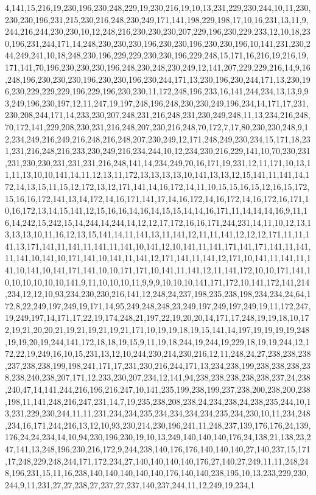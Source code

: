 4,141,15,216,19,230,196,230,248,229,19,230,216,19,10,13,231,229,230,244,10,11,230,230,230,196,231,215,230,216,248,230,249,171,141,198,229,198,17,10,16,231,13,11,9,244,216,244,230,230,10,12,248,216,230,230,230,207,229,196,230,229,233,12,10,18,230,196,231,244,171,14,248,230,230,230,196,230,230,196,230,230,196,10,141,231,230,244,249,241,10,18,248,230,196,229,229,230,230,196,229,248,15,171,16,216,19,216,19,171,141,70,196,230,230,230,196,248,230,248,230,249,12,141,207,229,229,216,14,9,16,248,196,230,230,230,196,230,230,196,230,244,171,13,230,196,230,244,171,13,230,196,230,229,229,229,196,229,196,230,230,11,172,248,196,233,16,141,244,234,13,13,9,93,249,196,230,197,12,11,247,19,197,248,196,248,230,230,249,196,234,14,171,17,231,230,208,244,171,14,233,230,207,248,231,216,248,231,230,249,248,11,13,234,216,248,70,172,141,229,208,230,231,216,248,207,230,216,248,70,172,7,17,80,230,230,248,9,12,234,249,216,249,216,248,216,248,207,230,249,12,171,248,249,230,234,15,171,18,231,231,216,248,216,233,230,249,216,234,244,10,12,234,230,216,229,141,10,70,230,231,231,230,230,231,231,231,216,248,141,14,234,249,70,16,171,19,231,12,11,171,10,13,11,11,13,10,10,141,14,11,12,13,11,172,13,13,13,13,10,141,13,13,12,15,141,11,141,14,172,14,13,15,11,15,12,172,13,12,171,141,14,16,172,14,11,10,15,15,16,15,12,16,15,172,15,16,16,172,141,13,14,172,14,16,171,141,17,14,16,172,14,16,172,14,16,172,16,171,10,16,172,13,14,15,141,12,15,16,16,14,16,14,15,15,14,14,16,171,11,14,14,14,16,9,11,16,14,242,15,242,15,14,244,14,244,14,12,12,17,172,16,16,171,244,231,14,11,10,12,13,13,13,13,10,11,16,12,13,15,141,14,11,141,13,11,141,12,11,11,141,12,12,12,171,11,11,141,13,171,141,11,141,11,141,11,141,10,141,12,10,141,11,141,171,141,171,141,11,141,11,141,10,141,10,171,141,10,141,11,141,12,171,141,11,141,12,171,10,141,11,141,11,141,10,141,10,141,171,141,10,10,171,171,10,141,11,141,12,11,141,172,10,10,171,141,10,10,10,10,10,10,141,9,11,10,10,10,11,9,9,9,10,10,10,141,171,172,10,141,172,141,214,234,12,12,10,93,234,230,230,216,141,12,248,24,237,198,235,238,198,234,234,24,64,172,8,22,249,197,249,19,171,14,95,249,248,248,23,249,197,249,197,249,19,11,172,247,19,249,197,14,171,17,22,19,174,248,21,197,22,19,20,20,14,171,17,248,19,19,18,10,172,19,21,20,20,21,19,21,19,21,19,21,171,10,19,19,18,19,15,141,14,197,19,19,19,19,248,19,19,20,19,244,141,172,18,18,19,15,9,11,19,18,244,19,244,19,229,18,19,19,244,12,172,22,19,249,16,10,15,231,13,12,10,244,230,214,230,216,12,11,248,24,27,238,238,238,237,238,238,199,198,241,171,17,231,230,216,244,171,13,234,238,199,238,238,238,238,238,240,238,207,171,12,233,230,207,234,12,141,94,238,238,238,238,238,237,24,238,240,47,14,141,244,216,196,216,247,10,141,235,199,238,199,237,238,200,238,200,238,198,11,141,248,216,247,231,14,7,19,235,238,208,238,24,234,238,24,238,235,244,10,13,231,229,230,244,11,11,231,234,234,235,234,234,234,234,235,234,230,10,11,234,248,234,16,171,244,216,13,12,10,93,230,214,230,196,241,11,248,237,139,176,176,24,139,176,24,24,234,14,10,94,230,196,230,19,10,13,249,140,140,140,176,24,138,21,138,23,247,141,13,248,196,230,216,172,9,244,238,140,176,176,140,140,140,27,140,237,15,171,17,248,229,248,244,171,172,234,27,140,140,140,140,176,27,140,27,249,11,11,248,248,196,231,15,11,16,238,140,140,140,140,140,176,140,140,238,195,10,13,233,229,230,244,9,11,231,27,27,238,27,237,27,237,140,237,244,11,12,249,19,234,1